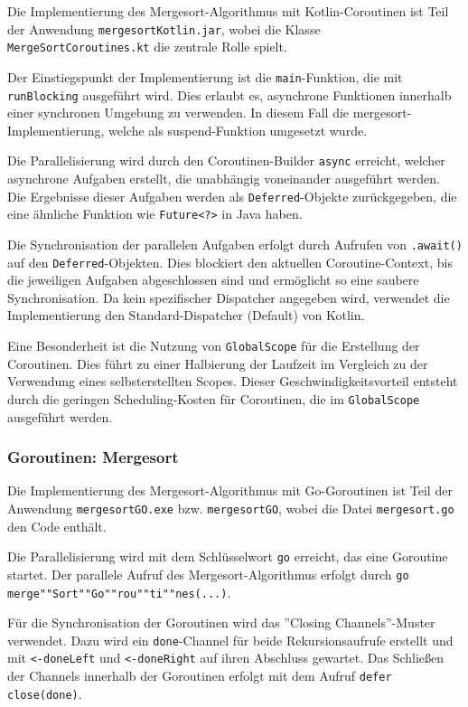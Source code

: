 \documentclass[fontsize=12pt,paper=a4,twoside=semi,parskip=half-,headsepline,headinclude]{scrreprt}
\begin{document}
Die Implementierung des Mergesort-Algorithmus mit Kotlin-Coroutinen ist Teil der Anwendung \texttt{mergesortKotlin.jar}, wobei die Klasse \texttt{MergeSortCoroutines.kt} die zentrale Rolle spielt.

Der Einstiegspunkt der Implementierung ist die \texttt{main}-Funktion, die mit \texttt{runBlocking} ausgeführt wird. Dies erlaubt es, asynchrone Funktionen innerhalb einer synchronen Umgebung zu verwenden. In diesem Fall die mergesort-Implementierung, welche als suspend-Funktion umgesetzt wurde.

Die Parallelisierung wird durch den Coroutinen-Builder \texttt{async} erreicht, welcher asynchrone Aufgaben erstellt, die unabhängig voneinander ausgeführt werden. Die Ergebnisse dieser Aufgaben werden als \texttt{Deferred}-Objekte zurückgegeben, die eine ähnliche Funktion wie \texttt{Future<?>} in Java haben.

Die Synchronisation der parallelen Aufgaben erfolgt durch Aufrufen von \texttt{.await()} auf den \texttt{Deferred}-Objekten. Dies blockiert den aktuellen Coroutine-Context, bis die jeweiligen Aufgaben abgeschlossen sind und ermöglicht so eine saubere Synchronisation. Da kein spezifischer Dispatcher angegeben wird, verwendet die Implementierung den Standard-Dispatcher (Default) von Kotlin.

Eine Besonderheit ist die Nutzung von \texttt{GlobalScope} für die Erstellung der Coroutinen. Dies führt zu einer Halbierung der Laufzeit im Vergleich zu der Verwendung eines selbst\-erstellten Scopes. Dieser Geschwindigkeitsvorteil entsteht durch die geringen Scheduling-Kosten für Coroutinen, die im \texttt{GlobalScope} ausgeführt werden.

\subsubsection{Goroutinen: Mergesort}

Die Implementierung des Mergesort-Algorithmus mit Go-Goroutinen ist Teil der Anwendung \texttt{mergesortGO.exe} bzw. \texttt{mergesortGO}, wobei die Datei \texttt{mergesort.go} den Code enthält.

Die Parallelisierung wird mit dem Schlüsselwort \texttt{go} erreicht, das eine Goroutine startet. Der parallele Aufruf des Mergesort-Algorithmus erfolgt durch \texttt{go merge""Sort""Go""rou""ti""nes(...)}. 

Für die Synchronisation der Goroutinen wird das ''Closing Channels''-Muster verwendet. Dazu wird ein \texttt{done}-Channel für beide Rekursionsaufrufe erstellt und mit \texttt{<-doneLeft} und \texttt{<-doneRight} auf ihren Abschluss gewartet. Das Schließen der Channels innerhalb der Goroutinen erfolgt mit dem Aufruf \texttt{defer close(done)}.
\end{document}
